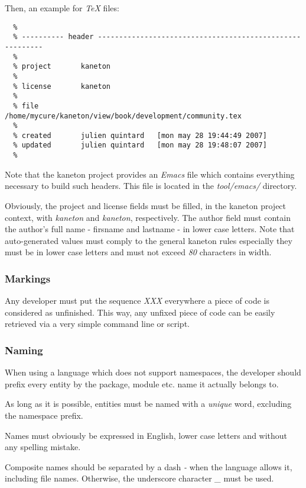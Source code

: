 Then, an example for \textit{TeX} files:

\begin{verbatim}
  %
  % ---------- header ---------------------------------------------------------
  %
  % project       kaneton
  %
  % license       kaneton
  %
  % file          /home/mycure/kaneton/view/book/development/community.tex
  %
  % created       julien quintard   [mon may 28 19:44:49 2007]
  % updated       julien quintard   [mon may 28 19:48:07 2007]
  %
\end{verbatim}

Note that the kaneton project provides an \textit{Emacs} file which contains
everything necessary to build such headers. This file is located in the
\textit{tool/emacs/} directory.

Obviously, the project and license fields must be filled, in the kaneton
project context, with \textit{kaneton} and \textit{kaneton}, respectively. The
author field must contain the author's full name - firsname and lastname -
in lower case letters. Note that auto-generated values must comply to
the general kaneton rules especially they must be in lower case letters and
must not exceed \textit{80} characters in width.


\subsubsection{Markings}

Any developer must put the sequence \textit{XXX} everywhere a piece of code
is considered as unfinished. This way, any unfixed piece of code can be
easily retrieved via a very simple command line or script.


\subsubsection{Naming}

When using a language which does not support namespaces, the developer should
prefix every entity by the package, module etc. name it actually belongs to.

As long as it is possible, entities must be named with a \textit{unique}
word, excluding the namespace prefix.

Names must obviously be expressed in English, lower case letters and
without any spelling mistake.

Composite names should be separated by a dash \textit{-} when the language
allows it, including file names. Otherwise, the underscore character
\textit{\_} must be used.

